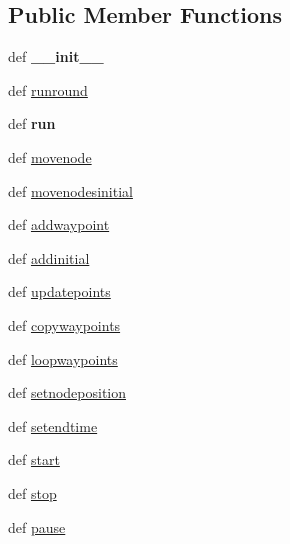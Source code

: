 \subsection*{Public Member Functions}
\begin{DoxyCompactItemize}
\item 
\hypertarget{classcore_1_1mobility_1_1_way_point_mobility_a70ee7c3f57b27c920603752d3c91ccd9}{def {\bfseries \+\_\+\+\_\+init\+\_\+\+\_\+}}\label{classcore_1_1mobility_1_1_way_point_mobility_a70ee7c3f57b27c920603752d3c91ccd9}

\item 
def \hyperlink{classcore_1_1mobility_1_1_way_point_mobility_a17be50ead7c443ea20ad948758934f81}{runround}
\item 
\hypertarget{classcore_1_1mobility_1_1_way_point_mobility_a2d2e2867b62358c4b522ded234b8ceb3}{def {\bfseries run}}\label{classcore_1_1mobility_1_1_way_point_mobility_a2d2e2867b62358c4b522ded234b8ceb3}

\item 
def \hyperlink{classcore_1_1mobility_1_1_way_point_mobility_a43683ff470f145bf74f03d546cb51525}{movenode}
\item 
def \hyperlink{classcore_1_1mobility_1_1_way_point_mobility_a948d8c3621f765f946b7e90f91347f69}{movenodesinitial}
\item 
def \hyperlink{classcore_1_1mobility_1_1_way_point_mobility_ae17eabad05236ce959abce071034c652}{addwaypoint}
\item 
def \hyperlink{classcore_1_1mobility_1_1_way_point_mobility_a13c36729e31d589a16a4e47237c921a2}{addinitial}
\item 
def \hyperlink{classcore_1_1mobility_1_1_way_point_mobility_a0bca5cfd9c2418b3a1a3c01921a01c55}{updatepoints}
\item 
def \hyperlink{classcore_1_1mobility_1_1_way_point_mobility_abbde7026d66b79f097e9a89359909fea}{copywaypoints}
\item 
def \hyperlink{classcore_1_1mobility_1_1_way_point_mobility_ae65eab878c3ae6b2bafb82de11e75334}{loopwaypoints}
\item 
def \hyperlink{classcore_1_1mobility_1_1_way_point_mobility_ac2a7494e725bbea516276d2327f33670}{setnodeposition}
\item 
def \hyperlink{classcore_1_1mobility_1_1_way_point_mobility_ae7c24b742c97f856bf5462980e287c28}{setendtime}
\item 
def \hyperlink{classcore_1_1mobility_1_1_way_point_mobility_ad64e05d65e8997ed77669091313ad80a}{start}
\item 
def \hyperlink{classcore_1_1mobility_1_1_way_point_mobility_aa711968ba9b871a2d5c357e7124841bb}{stop}
\item 
def \hyperlink{classcore_1_1mobility_1_1_way_point_mobility_a25d61c3464ee51626c6422e2b4e5735a}{pause}
\end{DoxyCompactItemize}
